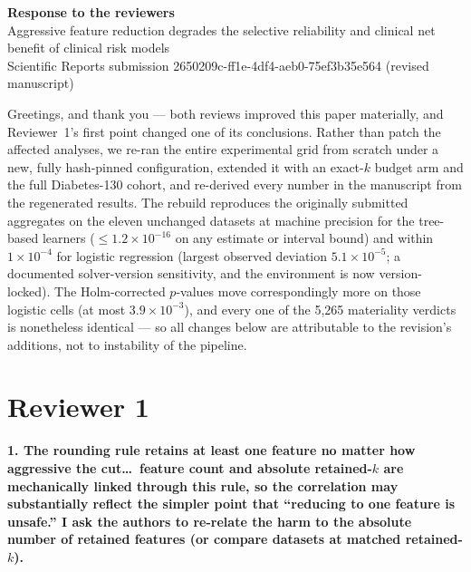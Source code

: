 \documentclass[11pt]{article}
\newcommand{\point}[1]{\par\medskip\noindent\textbf{\color{revblue}#1}\par\smallskip}
\begin{document}
\begin{center}
{\large\textbf{Response to the reviewers}}\\[2pt]
Aggressive feature reduction degrades the selective reliability and clinical net benefit of
clinical risk models\\[2pt]
Scientific Reports submission 2650209c-ff1e-4df4-aeb0-75ef3b35e564 (revised manuscript)
\end{center}

Greetings, and thank you --- both reviews improved this paper materially, and Reviewer~1's first
point changed one of its conclusions. Rather than patch the affected analyses, we re-ran the entire
experimental grid from scratch under a new, fully hash-pinned configuration, extended it with an
exact-$k$ budget arm and the full Diabetes-130 cohort, and re-derived every number in the manuscript
from the regenerated results. The rebuild reproduces the originally submitted aggregates on the
eleven unchanged datasets at machine precision for the tree-based learners
($\le1.2\times10^{-16}$ on any estimate or interval bound) and within $1\times10^{-4}$ for logistic
regression (largest observed deviation $5.1\times10^{-5}$; a documented solver-version sensitivity,
and the environment is now version-locked). The Holm-corrected $p$-values move correspondingly more
on those logistic cells (at most $3.9\times10^{-3}$), and every one of the 5{,}265 materiality
verdicts is nonetheless identical --- so all changes below are attributable to the revision's
additions, not to instability of the pipeline.

\section*{Reviewer 1}

\point{1. The rounding rule retains at least one feature no matter how aggressive the cut\ldots\
feature count and absolute retained-$k$ are mechanically linked through this rule, so the
correlation may substantially reflect the simpler point that ``reducing to one feature is unsafe.''
I ask the authors to re-relate the harm to the absolute number of retained features (or compare
datasets at matched retained-$k$).}
\end{document}
